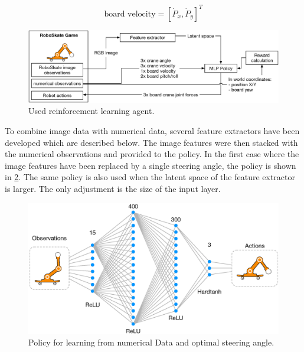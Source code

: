 \documentclass[conference]{IEEEtran}
\begin{document}
\begin{equation}
\text{board velocity} = [\dot{P}_x , \dot{P}_y]^T
\end{equation}

\begin{figure}[ht]
  \centering
  \includegraphics[width=1.0\linewidth]{images/RL_agent.eps}
  \caption{Used reinforcement learning agent.}
\label{fig:RL_agent}
\end{figure}

To combine image data with numerical data, several feature extractors have been developed which are described below. The image features were then stacked with the numerical observations and provided to the policy. In the first case where the image features have been replaced by a single steering angle, the policy is shown in \figurename  \ref{fig:MLP_Policy}. The same policy is also used when the latent space of the feature extractor is larger. The only adjustment is the size of the input layer.


\begin{figure}[!t]
  \centering
  \includegraphics[width=1.0\linewidth]{images/SAC_MLP_Policy.eps}
  \caption{Policy for learning from numerical Data and optimal steering angle.}
\label{fig:MLP_Policy}
\end{figure}
\end{document}
